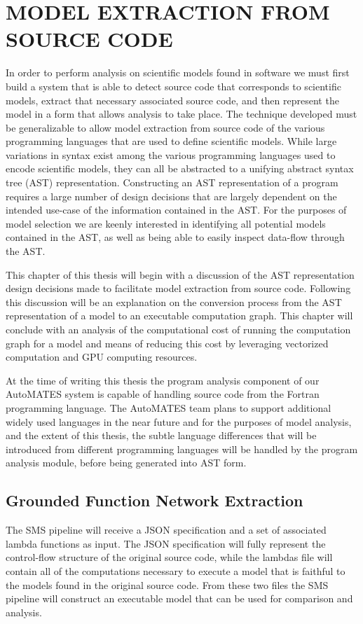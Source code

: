 \chapter{MODEL EXTRACTION FROM SOURCE CODE\label{chapter:extraction}}
In order to perform analysis on scientific models found in software we must first build a system that is able to detect source code that corresponds to scientific models, extract that necessary associated source code, and then represent the model in a form that allows analysis to take place. The technique developed must be generalizable to allow model extraction from source code of the various programming languages that are used to define scientific models. While large variations in syntax exist among the various programming languages used to encode scientific models, they can all be abstracted to a unifying abstract syntax tree (AST) representation. Constructing an AST representation of a program requires a large number of design decisions that are largely dependent on the intended use-case of the information contained in the AST. For the purposes of model selection we are keenly interested in identifying all potential models contained in the AST, as well as being able to easily inspect data-flow through the AST.

This chapter of this thesis will begin with a discussion of the AST representation design decisions made to facilitate model extraction from source code. Following this discussion will be an explanation on the conversion process from the AST representation of a model to an executable computation graph. This chapter will conclude with an analysis of the computational cost of running the computation graph for a model and means of reducing this cost by leveraging vectorized computation and GPU computing resources.

At the time of writing this thesis the program analysis component of our AutoMATES system is capable of handling source code from the Fortran programming language. The AutoMATES team plans to support additional widely used languages in the near future and for the purposes of model analysis, and the extent of this thesis, the subtle language differences that will be introduced from different programming languages will be handled by the program analysis module, before being generated into AST form.


\section{Grounded Function Network Extraction\label{sec:grfn_extract}}
The SMS pipeline will receive a JSON specification and a set of associated lambda functions as input. The JSON specification will fully represent the control-flow structure of the original source code, while the lambdas file will contain all of the computations necessary to execute a model that is faithful to the models found in the original source code. From these two files the SMS pipeline will construct an executable model that can be used for comparison and analysis.

